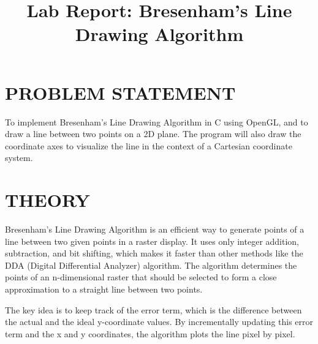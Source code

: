 \documentclass{article}
\begin{document}
\title{Lab Report: Bresenham's Line Drawing Algorithm}
\author{}
\date{}
\maketitle

\section*{PROBLEM STATEMENT}
To implement Bresenham's Line Drawing Algorithm in C using OpenGL, and to draw a line between two points on a 2D plane. The program will also draw the coordinate axes to visualize the line in the context of a Cartesian coordinate system.

\section*{THEORY}
Bresenham's Line Drawing Algorithm is an efficient way to generate points of a line between two given points in a raster display. It uses only integer addition, subtraction, and bit shifting, which makes it faster than other methods like the DDA (Digital Differential Analyzer) algorithm. The algorithm determines the points of an n-dimensional raster that should be selected to form a close approximation to a straight line between two points.

The key idea is to keep track of the error term, which is the difference between the actual and the ideal y-coordinate values. By incrementally updating this error term and the x and y coordinates, the algorithm plots the line pixel by pixel.
\end{document}
